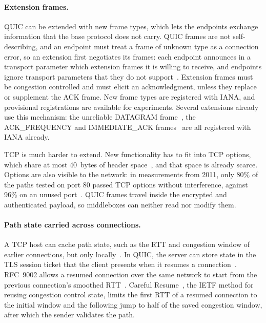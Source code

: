 \paragraph{Extension frames.} QUIC can be extended with new frame types, which lets
the endpoints exchange information that the base protocol does not carry. QUIC frames
are not self-describing, and an endpoint must treat a frame of unknown type as a
connection error, so an extension first negotiates its frames: each endpoint
announces in a transport parameter which extension frames it is willing to receive,
and endpoints ignore transport parameters that they do not support~\cite{rfc9000}.
Extension frames must be congestion controlled and must elicit an acknowledgment,
unless they replace or supplement the ACK frame. New frame types are registered with
IANA, and provisional registrations are available for experiments.
Several extensions already use this mechanism: the unreliable DATAGRAM
frame~\cite{rfc9221}, the ACK\_FREQUENCY and IMMEDIATE\_ACK frames~\cite{iyengar2026ackfrequency} are all registered with IANA already.

TCP is much harder
to extend. New functionality has to fit into TCP options, which share at most
40~bytes of header space~\cite{rfc793}, and that space is already
scarce. Options are also visible to the network: in
measurements from 2011, only 80\% of the paths tested on port 80 passed TCP options
without interference, against 96\% on an unused port~\cite{honda2011extend}. QUIC
frames travel inside the encrypted and authenticated payload, so middleboxes can
neither read nor modify them.

\paragraph{Path state carried across connections.} A TCP host can cache path state,
such as the RTT and congestion window of earlier connections, but only
locally~\cite{rfc9040}. In QUIC, the server can store state in the TLS session ticket
that the client presents when it resumes a connection~\cite{rfc9001}. RFC~9002 allows a
resumed connection over the same network to start from the previous connection's
smoothed RTT~\cite{rfc9002}. Careful Resume~\cite{rfc9959}, the IETF method for reusing congestion control state, limits
the first RTT of a resumed connection to the initial window and the following jump to
half of the saved congestion window, after which the sender validates the
path.

